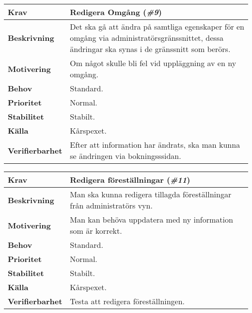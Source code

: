 \documentclass[a4paper, twoside, 11pt, titlepage]{article}
\begin{document}
		\begin{tabular} { p{2.6cm} p{12.5cm} }
			\hline
			\sffamily\textbf{Krav} & Redigera Omgång (\emph{\#9})  \\
			\hline
			\sffamily\textbf{Beskrivning} & Det ska gå att ändra på samtliga egenskaper för en omgång via administratörsgränssnittet, dessa ändringar ska synas i de gränssnitt som berörs.  \\
			\hline
			\sffamily\textbf{Motivering} & Om något skulle bli fel vid uppläggning av en ny omgång.  \\
			\hline
			\sffamily\textbf{Behov} & Standard.  \\
			\hline
			\sffamily\textbf{Prioritet} & Normal.  \\
			\hline
			\sffamily\textbf{Stabilitet} & Stabilt.  \\
			\hline
			\sffamily\textbf{Källa} & Kårspexet.  \\
			\hline
			\sffamily\textbf{Verifierbarhet} & Efter att information har ändrats, ska man kunna se ändringen via bokningsssidan.  \\
			\hline
		\end{tabular}
		\vspace{6mm}

		\begin{tabular} { p{2.6cm} p{12.5cm} }
			\hline
			\sffamily\textbf{Krav} & Redigera föreställningar (\emph{\#11})  \\
			\hline
			\sffamily\textbf{Beskrivning} & Man ska kunna redigera tillagda föreställningar från administratörs vyn.  \\
			\hline
			\sffamily\textbf{Motivering} & Man kan behöva uppdatera med ny information som är korrekt.  \\
			\hline
			\sffamily\textbf{Behov} & Standard.  \\
			\hline
			\sffamily\textbf{Prioritet} & Normal.  \\
			\hline
			\sffamily\textbf{Stabilitet} & Stabilt.  \\
			\hline
			\sffamily\textbf{Källa} & Kårspexet.  \\
			\hline
			\sffamily\textbf{Verifierbarhet} & Testa att redigera föreställningen.  \\
			\hline
		\end{tabular}
		\vspace{6mm}
\end{document}

